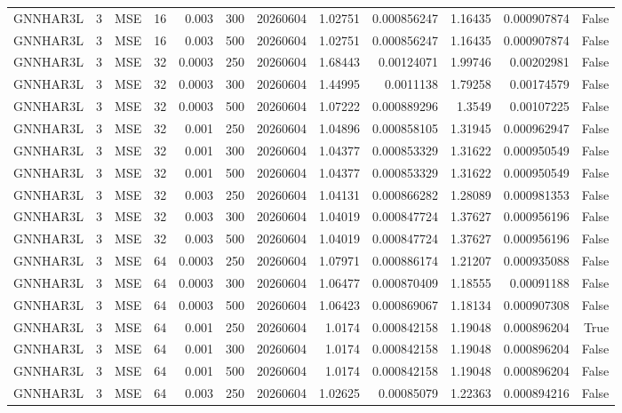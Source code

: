 \begin{tabular}{lrlrrrrrrrrr}
GNNHAR3L & 3 & MSE & 16 & 0.003 & 300 & 20260604 & 1.02751 & 0.000856247 & 1.16435 & 0.000907874 & False \\
GNNHAR3L & 3 & MSE & 16 & 0.003 & 500 & 20260604 & 1.02751 & 0.000856247 & 1.16435 & 0.000907874 & False \\
GNNHAR3L & 3 & MSE & 32 & 0.0003 & 250 & 20260604 & 1.68443 & 0.00124071 & 1.99746 & 0.00202981 & False \\
GNNHAR3L & 3 & MSE & 32 & 0.0003 & 300 & 20260604 & 1.44995 & 0.0011138 & 1.79258 & 0.00174579 & False \\
GNNHAR3L & 3 & MSE & 32 & 0.0003 & 500 & 20260604 & 1.07222 & 0.000889296 & 1.3549 & 0.00107225 & False \\
GNNHAR3L & 3 & MSE & 32 & 0.001 & 250 & 20260604 & 1.04896 & 0.000858105 & 1.31945 & 0.000962947 & False \\
GNNHAR3L & 3 & MSE & 32 & 0.001 & 300 & 20260604 & 1.04377 & 0.000853329 & 1.31622 & 0.000950549 & False \\
GNNHAR3L & 3 & MSE & 32 & 0.001 & 500 & 20260604 & 1.04377 & 0.000853329 & 1.31622 & 0.000950549 & False \\
GNNHAR3L & 3 & MSE & 32 & 0.003 & 250 & 20260604 & 1.04131 & 0.000866282 & 1.28089 & 0.000981353 & False \\
GNNHAR3L & 3 & MSE & 32 & 0.003 & 300 & 20260604 & 1.04019 & 0.000847724 & 1.37627 & 0.000956196 & False \\
GNNHAR3L & 3 & MSE & 32 & 0.003 & 500 & 20260604 & 1.04019 & 0.000847724 & 1.37627 & 0.000956196 & False \\
GNNHAR3L & 3 & MSE & 64 & 0.0003 & 250 & 20260604 & 1.07971 & 0.000886174 & 1.21207 & 0.000935088 & False \\
GNNHAR3L & 3 & MSE & 64 & 0.0003 & 300 & 20260604 & 1.06477 & 0.000870409 & 1.18555 & 0.00091188 & False \\
GNNHAR3L & 3 & MSE & 64 & 0.0003 & 500 & 20260604 & 1.06423 & 0.000869067 & 1.18134 & 0.000907308 & False \\
GNNHAR3L & 3 & MSE & 64 & 0.001 & 250 & 20260604 & 1.0174 & 0.000842158 & 1.19048 & 0.000896204 & True \\
GNNHAR3L & 3 & MSE & 64 & 0.001 & 300 & 20260604 & 1.0174 & 0.000842158 & 1.19048 & 0.000896204 & False \\
GNNHAR3L & 3 & MSE & 64 & 0.001 & 500 & 20260604 & 1.0174 & 0.000842158 & 1.19048 & 0.000896204 & False \\
GNNHAR3L & 3 & MSE & 64 & 0.003 & 250 & 20260604 & 1.02625 & 0.00085079 & 1.22363 & 0.000894216 & False \\

\end{tabular}
